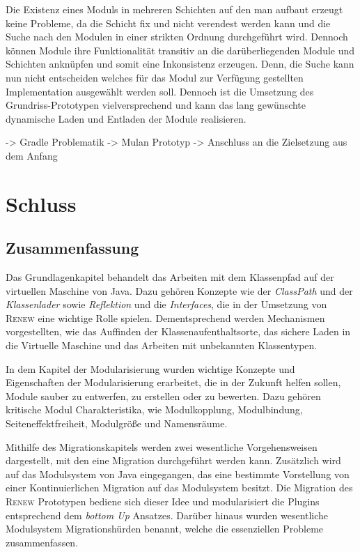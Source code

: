 Die Existenz eines Moduls in mehreren Schichten auf den man aufbaut erzeugt keine Probleme, da die Schicht fix und nicht verendest werden kann und die Suche nach den Modulen in einer strikten Ordnung durchgeführt wird. Dennoch können Module ihre Funktionalität transitiv an die darüberliegenden Module und Schichten anknüpfen und somit eine Inkonsistenz erzeugen. Denn, die Suche kann nun nicht entscheiden welches für das Modul zur Verfügung gestellten Implementation ausgewählt werden soll. \newline
Dennoch ist die Umsetzung des Grundriss-Prototypen vielversprechend und kann das lang gewünschte dynamische Laden und Entladen der Module realisieren. \bigbreak


-> Gradle Problematik 
-> Mulan Prototyp 
-> Anschluss an die Zielsetzung aus dem Anfang 



\chapter{Schluss}


\section{Zusammenfassung}

Das Grundlagenkapitel behandelt das Arbeiten mit dem Klassenpfad auf der virtuellen Maschine von Java. Dazu gehören Konzepte wie der \textit{ClassPath} und der \textit{Klassenlader} sowie \textit{Reflektion} und die \textit{Interfaces}, die in der Umsetzung von \textsc{Renew} eine wichtige Rolle spielen. Dementsprechend werden Mechanismen vorgestellten, wie das Auffinden der Klassenaufenthaltsorte, das sichere Laden in die Virtuelle Maschine und das Arbeiten mit unbekannten Klassentypen.\bigbreak

In dem Kapitel der Modularisierung wurden wichtige Konzepte und Eigenschaften der Modularisierung erarbeitet, die in der Zukunft helfen sollen, Module sauber zu entwerfen, zu erstellen oder zu bewerten. Dazu gehören kritische Modul Charakteristika, wie Modulkopplung, Modulbindung, Seiteneffektfreiheit, Modulgröße und Namensräume. \bigbreak

Mithilfe des Migrationskapitels werden zwei wesentliche Vorgehensweisen dargestellt, mit den eine Migration durchgeführt werden kann. Zusätzlich wird auf das Modulsystem von Java eingegangen, das eine bestimmte Vorstellung von einer Kontinuierlichen Migration auf das Modulsystem besitzt. \newline
Die Migration des \textsc{Renew} Prototypen bediene sich dieser Idee und modularisiert die Plugins entsprechend dem \textit{bottom Up} Ansatzes. Darüber hinaus wurden wesentliche Modulsystem Migrationshürden benannt, welche die essenziellen Probleme zusammenfassen. \bigbreak

